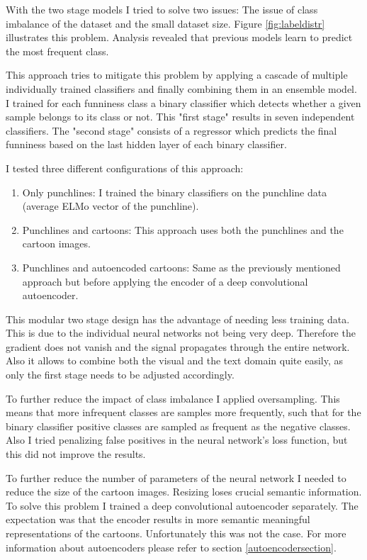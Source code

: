 \documentclass[draft,final,oneside]{vutinfth} %
\begin{document}
With the two stage models I tried to solve two issues: The issue of class imbalance of the dataset and the small dataset size. Figure \ref{fig:labeldistr} illustrates this problem. Analysis revealed that previous models learn to predict the most frequent class.

This approach tries to mitigate this problem by applying a cascade of multiple individually trained classifiers and finally combining them in an ensemble model. I trained for each funniness class a binary classifier which detects whether a given sample belongs to its class or not. This "first stage" results in seven independent classifiers. The "second stage" consists of a regressor which predicts the final funniness based on the last hidden layer of each binary classifier.

I tested three different configurations of this approach:

\begin{enumerate}

\item Only punchlines: I trained the binary classifiers on the punchline data (average ELMo vector of the punchline).
\item Punchlines and cartoons: This approach uses both the punchlines and the cartoon images.
\item Punchlines and autoencoded cartoons: Same as the previously mentioned approach but before applying the encoder of a deep convolutional autoencoder.

\end{enumerate}

This modular two stage design has the advantage of needing less training data. This is due to the individual neural networks not being very deep. Therefore the gradient does not vanish and the signal propagates through the entire network. Also it allows to combine both the visual and the text domain quite easily, as only the first stage needs to be adjusted accordingly.

To further reduce the impact of class imbalance I applied oversampling. This means that more infrequent classes are samples more frequently, such that for the binary classifier positive classes are sampled as frequent as the negative classes. Also I tried penalizing false positives in the neural network's loss function, but this did not improve the results.

To further reduce the number of parameters of the neural network I needed to reduce the size of the cartoon images. Resizing loses crucial semantic information. To solve this problem I trained a deep convolutional autoencoder separately. The expectation was that the encoder results in more semantic meaningful representations of the cartoons. Unfortunately this was not the case. For more information about autoencoders please refer to section \ref{autoencodersection}.
\end{document}
